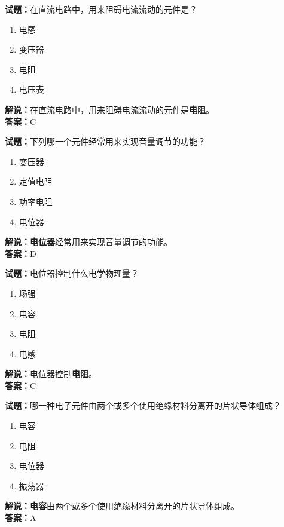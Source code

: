 \documentclass{ctexbook}
\begin{document}
\vspace{1em}

\textbf{试题：}在直流电路中，用来阻碍电流流动的元件是？
\begin{enumerate}[leftmargin=3em]
  \item 电感
  \item 变压器
  \item 电阻
  \item 电压表
\end{enumerate}
\noindent\textbf{解说：}在直流电路中，用来阻碍电流流动的元件是\textbf{电阻}。\\\noindent\textbf{答案：}C

\vspace{1em}

\textbf{试题：}下列哪一个元件经常用来实现音量调节的功能？
\begin{enumerate}[leftmargin=3em]
  \item 变压器
  \item 定值电阻
  \item 功率电阻
  \item 电位器
\end{enumerate}
\noindent\textbf{解说：}\textbf{电位器}经常用来实现音量调节的功能。\\\noindent\textbf{答案：}D

\vspace{1em}

\textbf{试题：}电位器控制什么电学物理量？
\begin{enumerate}[leftmargin=3em]
  \item 场强
  \item 电容
  \item 电阻
  \item 电感
\end{enumerate}
\noindent\textbf{解说：}电位器控制\textbf{电阻}。\\\noindent\textbf{答案：}C

\vspace{1em}

\textbf{试题：}哪一种电子元件由两个或多个使用绝缘材料分离开的片状导体组成？
\begin{enumerate}[leftmargin=3em]
  \item 电容
  \item 电阻
  \item 电位器
  \item 振荡器
\end{enumerate}
\noindent\textbf{解说：}\textbf{电容}由两个或多个使用绝缘材料分离开的片状导体组成。\\\noindent\textbf{答案：}A
\end{document}
